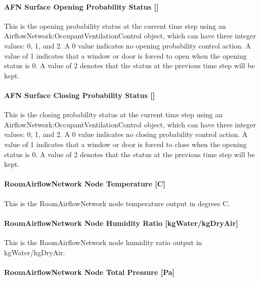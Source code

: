 \paragraph{AFN Surface Opening Probability Status {[]}}\label{afn-surface-opening-probability-status}

This is the opening probability status at the current time step using an AirflowNetwork:OccupantVentilationControl object, which can have three integer values: 0, 1, and 2. A 0 value indicates no opening probability control action. A value of 1 indicates that a window or door is forced to open when the opening status is 0. A value of 2 denotes that the status at the previous time step will be kept.

\paragraph{AFN Surface Closing Probability Status {[]}}\label{afn-surface-closing-probability-status}

This is the closing probability status at the current time step using an AirflowNetwork:OccupantVentilationControl object, which can have three integer values: 0, 1, and 2. A 0 value indicates no closing probability control action. A value of 1 indicates that a window or door is forced to close when the opening status is 0. A value of 2 denotes that the status at the previous time step will be kept.

\paragraph{RoomAirflowNetwork Node Temperature {[}C{]}}\label{roomairflownetwork-node-temperature-c}

This is the RoomAirflowNetwork node temperature output in degrees C.

\paragraph{RoomAirflowNetwork Node Humidity Ratio {[}kgWater/kgDryAir{]}}\label{roomairflownetwork-node-humidity-ratio-kgwaterkgdryair}

This is the RoomAirflowNetwork node humidity ratio output in kgWater/kgDryAir.

\paragraph{RoomAirflowNetwork Node Total Pressure {[}Pa{]}}\label{roomairflownetwork-node-total-pressure-pa}

